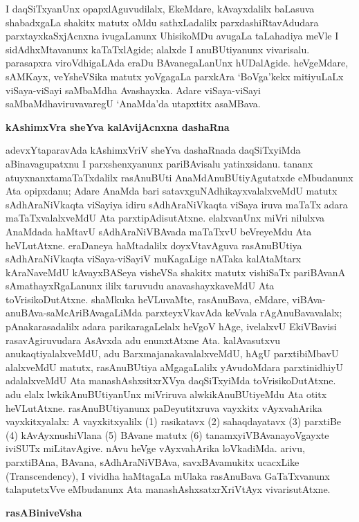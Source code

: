I daqSiTxyanUnx opapxlAguvudilalx, EkeMdare, kAvayxdalilx baLasuva shabadxgaLa shakitx matutx oMdu sathxLadalilx parxdashiRtavAdudara parxtayxkaSxjAcnxna ivugaLanunx UhisikoMDu avugaLa taLahadiya meVle I sidAdhxMtavanunx kaTaTxlAgide; alalxde I anuBUtiyanunx vivarisalu. parasapxra viroVdhigaLAda eraDu BAvanegaLanUnx hUDalAgide. heVgeMdare, sAMKayx, veYsheVSika matutx yoVgagaLa parxkAra `BoVga'kekx mitiyuLaLx viSaya-viSayi saMbaMdha Avashayxka. Adare viSaya-viSayi saMbaMdhaviruvavaregU `AnaMda'da utapxtitx asaMBava.

\bigskip
\begin{center}
{\Large\bf kAshimxVra sheYva kalAvijAcnxna dashaRna}
\end{center}

adevxYtaparavAda kAshimxVriV sheYva dashaRnada daqSiTxyiMda aBinavagupatxnu I parxshenx\-yanunx pariBAvisalu yatinxsidanu. tananx atuyxnanxtamaTaTxdalilx rasAnuBUti AnaMdAnu\-BUtiyAgutatxde eMbudanunx Ata opipxdanu; Adare AnaMda bari satavxguNAdhikayxvalalx\-veMdU matutx sAdhAraNiVkaqta viSayiya idiru sAdhAraNiVkaqta viSaya iruva maTaTx adara maTaTxvalalxveMdU Ata parxtipAdisutAtxne. elalxvanUnx miVri nilulxva AnaMdada haMtavU sAdhAraNiVBAvada maTaTxvU beVreyeMdu Ata heVLutAtxne. eraDaneya haMta\-dalilx doyxVtavAguva rasAnuBUtiya sAdhAraNiVkaqta viSaya-viSayiV muKagaLige nATaka kalAtaMtarx kAraNaveMdU kAvayxBASeya visheVSa shakitx matutx vishiSaTx pariBAvanA sAmathayxRgaLanunx ililx taruvudu anavashayxkaveMdU Ata toVrisikoDutAtxne. shaMkuka heVLuvaMte, rasAnuBava, eMdare, viBAva-anuBAva-saMcAriBAvagaLiMda parxteyxVka\-vAda keVvala rAgAnuBavavalalx; pAnakarasadalilx adara parikaragaLelalx heVgoV hAge, ivelalxvU EkiVBavisi rasavAgiruvudara AsAvxda adu enunxtAtxne Ata. kalAvasutxvu anukaqtiyalalxveMdU, adu BarxmajanakavalalxveMdU, hAgU parxtibiMbavU alalxveMdU matutx, rasAnuBUtiya aMgagaLalilx yAvudoMdara parxtinidhiyU adalalxveMdU Ata manashAshxsitxrXVya daqSiTxyiMda toVrisikoDutAtxne. adu elalx lwkikAnuBUtiyanUnx miVriruva alwkikAnuBUtiyeMdu Ata otitx heVLutAtxne. rasAnuBUtiyanunx paDeyutitxruva vayxkitx vAyxvahArika vayxkitxyalalx: A vayxkitxyalilx (1) rasikatavx (2) sahaqdayatavx (3) parxtiBe (4) kAvAyxnushiVlana (5) BAvane matutx (6) tanamxyiVBAvanayoVgayxte iviSUTx miLitavAgive. nAvu heVge vAyxvahArika loVkadiMda. arivu, parxtiBAna, BAvana, sAdhAraNiVBAva, savxBAvamukitx ucacxLike {\rm(Transcendency)}, I vividha haMtagaLa mUlaka rasAnuBava GaTaTxvanunx talaputetxVve eMbudanunx Ata manashAshxsatxrXriVtAyx vivarisutAtxne.

\smallskip
\begin{center}
{\Large\bf rasABiniveVsha}
\end{center}

